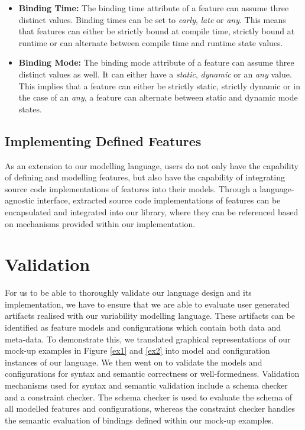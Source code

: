 \documentclass[conference]{IEEEtran}
\begin{document}
\begin{itemize}
\begin{itemize}
    \item \textbf{Binding Time:} The binding time attribute of a feature can assume three distinct values. Binding times can be set to \textit{early}, \textit{late} or \textit{any}. This means that features can either be strictly bound at compile time, strictly bound at runtime or can alternate between compile time and runtime state values.
    
    \item \textbf{Binding Mode:} The binding mode attribute of a feature can assume three distinct values as well. It can either have a \textit{static}, \textit{dynamic} or an \textit{any} value. This implies that a feature can either be strictly static, strictly dynamic or in the case of an \textit{any}, a feature can alternate between static and dynamic mode states.
\end{itemize}

\end{itemize}

\subsection{Implementing Defined Features}
As an extension to our modelling language, users do not only have the capability of defining and modelling features, but also have the capability of integrating source code implementations of features into their models. Through a language-agnostic interface, extracted source code implementations of features can be encapsulated and integrated into our library, where they can be referenced based on mechanisms provided within our implementation.

\section{Validation}
For us to be able to thoroughly validate our language design and its implementation, we have to ensure that we are able to evaluate user generated artifacts realised with our variability modelling language. These artifacts can be identified as feature models and configurations which contain both data and meta-data. To demonstrate this, we translated graphical representations of our mock-up examples in Figure \ref{ex1} and \ref{ex2} into model and configuration instances of our language. We then went on to validate the models and configurations for syntax and semantic correctness or well-formedness. Validation mechanisms used for syntax and semantic validation include a schema checker and a constraint checker. The schema checker is used to evaluate the schema of all modelled features and configurations, whereas the constraint checker handles the semantic evaluation of bindings defined within our mock-up examples.
\end{document}

